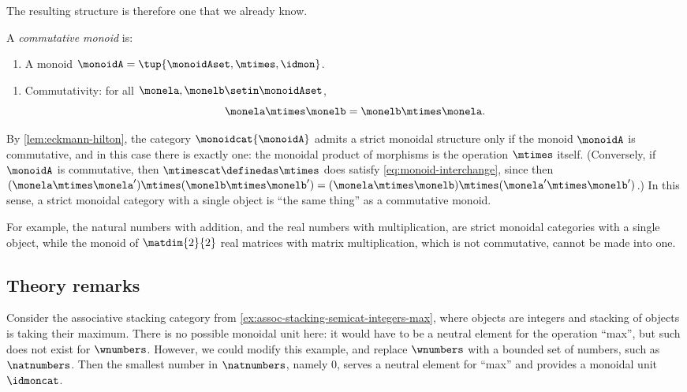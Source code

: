 The resulting structure is therefore one that we already know.

\begin{ctdefinition}
    \label{def:commutative-monoid}
    A \emph{commutative monoid} is:

    \constit
    \begin{enumerate}
        \item A monoid $\monoidA = \tup{\monoidAset, \mtimes, \idmon}$.
    \end{enumerate}

    \condit
    \begin{enumerate}
        \item Commutativity: for all $\monela, \monelb \setin \monoidAset$,
              \begin{equation}
                  \monela \mtimes \monelb = \monelb \mtimes \monela.
              \end{equation}
    \end{enumerate}
\end{ctdefinition}

By \cref{lem:eckmann-hilton}, the category $\monoidcat{\monoidA}$ admits a strict monoidal structure only if the monoid $\monoidA$ is commutative, and in this case there is exactly one: the monoidal product of morphisms is the operation $\mtimes$ itself.
(Conversely, if $\monoidA$ is commutative, then $\mtimescat \definedas \mtimes$ does satisfy \cref{eq:monoid-interchange}, since then $(\monela \mtimes \monela') \mtimes (\monelb \mtimes \monelb') = (\monela \mtimes \monelb) \mtimes (\monela' \mtimes \monelb')$.)
In this sense, a strict monoidal category with a single object is ``the same thing'' as a commutative monoid.

For example, the natural numbers with addition, and the real numbers with multiplication, are strict monoidal categories with a single object, while the monoid of $\matdim{2}{2}$ real matrices with matrix multiplication, which is not commutative, cannot be made into one.




\subsection{Theory remarks}


\begin{example}
    Consider the associative stacking category from \cref{ex:assoc-stacking-semicat-integers-max}, where objects are integers and stacking of objects is taking their maximum.
    There is no possible monoidal unit here: it would have to be a neutral element for the operation ``max'', but such does not exist for $\wnumbers$.
    However, we could modify this example, and replace $\wnumbers$ with a bounded set of numbers, such as $\natnumbers$.
    Then the smallest number in $\natnumbers$, namely $0$, serves a neutral element for ``max'' and provides a monoidal unit $\idmoncat$.
\end{example}

